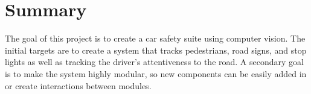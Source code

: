 \section{Summary}

The goal of this project is to create a car safety suite using computer vision.
The initial targets are to create a system that tracks pedestrians, road signs, and stop lights as well as tracking the driver's attentiveness to the road.
A secondary goal is to make the system highly modular, so new components can be easily added in or create interactions between modules.